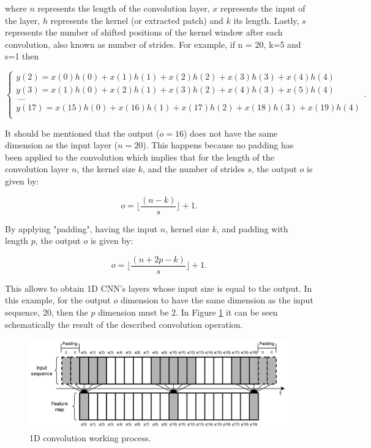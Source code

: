 where $n$ represents the length of the convolution layer, $x$ represents the input of the layer, $h$ represents the kernel (or extracted patch) and $k$ its length. Lastly, $s$ represents the number of shifted positions of the kernel window after each convolution, also known as number of strides. For example, if n = 20, k=5 and s=1 then

\begin{equation}
    \begin{cases} 
        y(2)=x(0)h(0)+x(1)h(1)+x(2)h(2)+x(3)h(3)+x(4)h(4)\\
        y(3)=x(1)h(0)+x(2)h(1)+x(3)h(2)+x(4)h(3)+x(5)h(4)\\
        \  ...\\
        y(17)=x(15)h(0)+x(16)h(1)+x(17)h(2)+x(18)h(3)+x(19)h(4)\\
    \end{cases} .
    \label{noncausal}
\end{equation}

It should be mentioned that the output ($o=16$) does not have the same dimension as the input layer ($n=20$). This happens because no padding has been applied to the convolution which implies that for the length of the convolution layer $n$, the kernel size $k$, and the number of strides $s$, the output $o$ is given by:

\begin{equation}
    o = \lfloor \frac{(n-k)}{s} \rfloor + 1 .
\end{equation}

By applying "padding", having the input $n$, kernel size $k$, and padding with length $p$, the output $o$ is given by:

\begin{equation}
    o = \lfloor \frac{(n+2p-k)}{s} \rfloor + 1 .
\end{equation}

This allows to obtain \ac{1D CNN}'s layers whose input size is equal to the output. In this example, for the output $o$ dimension to have the same dimension as the input sequence, 20, then the $p$ dimension must be 2. In Figure \ref{conv1} it can be seen schematically the result of the described convolution operation.

\begin{figure}[h!]
    \centering
    \begin{center}
    \includegraphics[width=1\textwidth]{Images/conv1.png}
    \caption{1D convolution working process.}
    \label{conv1}
    \end{center}
\end{figure}

